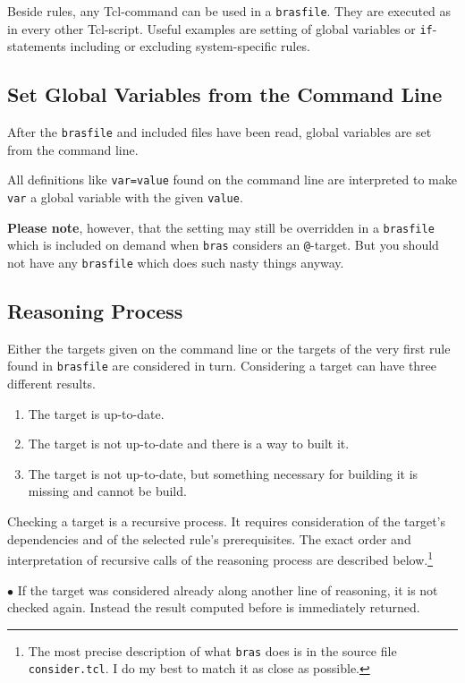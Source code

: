 \documentclass[12pt]{article}
\newcommand{\bras}{\texttt{bras}}
\begin{document}
Beside rules, any Tcl-command can be used in a \texttt{brasfile}. They
are executed as in every other Tcl-script. Useful examples are setting
of global variables or \texttt{if}-statements including or excluding
system-specific rules.

\subsection{Set Global Variables from the Command Line}
After the \texttt{brasfile} and included files have been read,
global variables are set from the command line.

All definitions like \texttt{var=value} found on the command
line are interpreted to make \texttt{var} a global variable with the
given \texttt{value}.

\textbf{Please note}, however, that the setting may still be
overridden in a \texttt{brasfile} which is included on demand when
\bras{} considers an \texttt{@}-target. But you should not have any
\texttt{brasfile} which does such nasty things anyway.

\subsection{Reasoning Process}
\label{secReasoning}
Either the targets given on the command line or the targets of the
very first rule found in \texttt{brasfile} are considered in
turn. Considering a target can have three different results. 
\begin{enumerate}
\item
The target is up-to-date.
\item
The target is not up-to-date and there is a way to built it.
\item
The target is not up-to-date, but something necessary for building it
is missing and cannot be build.
\end{enumerate}
Checking a target is a recursive process. It requires consideration of
the target's dependencies and of the selected rule's
prerequisites. The exact order and interpretation of recursive calls
of the reasoning process are described below.\footnote{The most
precise description of what \bras{} does is in the
source file \texttt{consider.tcl}. I do my best to match it as close
as possible.}

$\bullet$ If the target was considered already along another line of
reasoning, it is not checked again. Instead the result computed before
is immediately returned.
\end{document}
